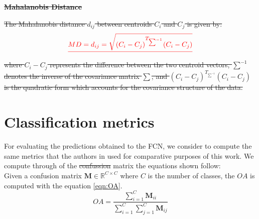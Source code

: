 \documentclass[journal,article,submit,pdftex,moreauthors]{Definitions/mdpi}
\providecommand{\DIFadd}[1]{{\protect\color{blue}\uwave{#1}}} %
\providecommand{\DIFdel}[1]{{\protect\color{red}\sout{#1}}}                      %
\providecommand{\DIFaddbegin}{} %
\providecommand{\DIFaddend}{} %
\providecommand{\DIFdelbegin}{} %
\providecommand{\DIFdelend}{} %
\begin{document}
\DIFdelbegin \textbf{\DIFdel{Mahalanobis Distance}}%
\DIFdelend %

\DIFdelbegin \DIFdel{The Mahalanobis distance $d_{ij}$ between centroids $C_{i}$ and $C_{j}$ is given by:
}\begin{displaymath}
   \DIFdel{MD = d_{ij} = \sqrt{(C_{i} - C_{j})^{T_{\sum^{-1}}} (C_{i} - C_{j})}
}\end{displaymath}%
\DIFdel{where $C_{i} - C_{j}$ represents the difference between the two centroid vectors, $\sum^{-1}$ denotes the inverse of the covariance matrix $\sum$, and $(C_{i} - C_{j})^{T_{\sum^{-1}}} (C_{i} - C_{j})$ is the quadratic form which accounts for the covariance structure of the data.
}\DIFdelend %

\section[\appendixname~\thesection]{Classification metrics}\label{distance_m} 
For evaluating the predictions obtained to the FCN, we consider to compute the same metrics that the authors in \cite{Russwurm2020} used for comparative purposes of this work. We compute through of the \DIFdelbegin \DIFdel{confussion }\DIFdelend \DIFaddbegin \DIFadd{confusion }\DIFaddend matrix the equations shown follow:\\

Given a confusion matrix $\mathbf{M} \in \mathbb{R}^{C \times C}$ where $C$ is the number of classes, the $OA$ is computed with the equation \ref{eqn:OA}.
\begin{equation}
	\label{eqn:OA}
	OA = \frac{\sum_{i=1}^{C} \mathbf{M}_{ii}}{\sum_{i=1}^{C} \sum_{j=1}^{C} \mathbf{M}_{ij}}
\end{equation}
\end{document}
